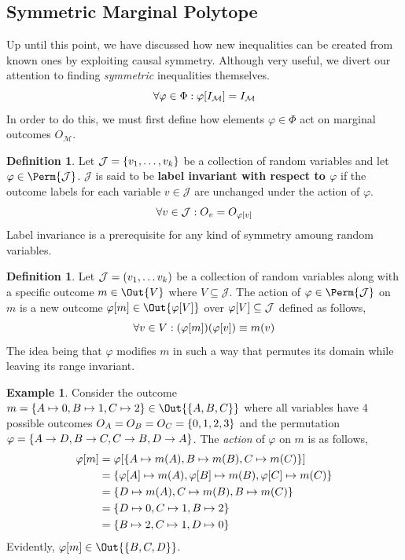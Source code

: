 \documentclass[aps, 10pt, english, twoside, pra, nofootinbib, longbibliography]{revtex4-1}
\theoremstyle{plain}
\theoremstyle{definition}
\newtheorem{definition}[theorem]{Definition}
\newtheorem{example}[theorem]{Example}
\theoremstyle{remark}
\newcommand{\gelem}{\varphi}
\newcommand{\action}[1]{\gelem\bs{#1}}
\newcommand{\mscenario}{\mathcal{M}}
\newcommand{\jointvar}{\mathcal{J}}
\newcommand{\term}[1]{\textcolor{Mahogany}{\textbf{#1}}}
\begin{document}
    \subsection{Symmetric Marginal Polytope}
    Up until this point, we have discussed how new inequalities can be created from known ones by exploiting causal symmetry. Although very useful, we divert our attention to finding \textit{symmetric} inequalities themselves.
    \[ \forall \gelem \in \Phi :  \action{I_{\mscenario}} = I_{\mscenario} \]
    In order to do this, we must first define how elements $\gelem \in \Phi$ act on marginal outcomes $O_{\mscenario}$.
    \begin{definition}
        Let $\jointvar = \bc{v_1, \ldots, v_k}$ be a collection of random variables and let $\gelem \in \Perm{\jointvar}$. $\jointvar$ is said to be \term{label invariant with respect to $\gelem$} if the outcome labels for each variable $v \in \jointvar$ are unchanged under the action of $\gelem$.
        \[ \forall v \in \jointvar : O_{v} = O_{\action{v}} \]
        Label invariance is a prerequisite for any kind of symmetry amoung random variables.
    \end{definition}
    \begin{definition}
        Let $\jointvar = \br{v_1, \ldots v_k}$ be a collection of random variables along with a specific outcome $m \in \Out{V}$ where $V \subseteq \jointvar$. The action of $\gelem \in \Perm{\jointvar}$ on $m$ is a new outcome $\action{m} \in \Out{\action{V}}$ over $\action{V} \subseteq \jointvar$ defined as follows,
        \[ \forall v \in V : \br{\action{m}}\br{\action{v}} \defined m \br{v} \]
        The idea being that $\gelem$ modifies $m$ in such a way that permutes its domain while leaving its range invariant.
    \end{definition}
    \begin{example}
        Consider the outcome $m = \bc{A \mapsto 0, B \mapsto 1, C \mapsto 2} \in \Out{\bc{A,B,C}}$ where all variables have $4$ possible outcomes $O_A = O_B = O_C = \bc{0,1,2,3}$ and the permutation $\gelem = \bc{A \to D, B \to C, C \to B, D \to A}$.
        The \textit{action} of $\gelem$ on $m$ is as follows,
        \begin{align*}
            \action{m} &= \action{\bc{A \mapsto m\br{A}, B \mapsto m\br{B}, C \mapsto m\br{C}}} \\
            &= \bc{\action{A} \mapsto m\br{A}, \action{B} \mapsto m\br{B}, \action{C} \mapsto m\br{C}} \\
            &= \bc{D \mapsto m\br{A}, C \mapsto m\br{B}, B \mapsto m\br{C}} \\
            &= \bc{D \mapsto 0, C \mapsto 1, B \mapsto 2} \\
            &= \bc{B \mapsto 2, C \mapsto 1, D \mapsto 0}
        \end{align*}
        Evidently, $\action{m} \in \Out{\bc{B, C, D}}$.
    \end{example}
\end{document}
